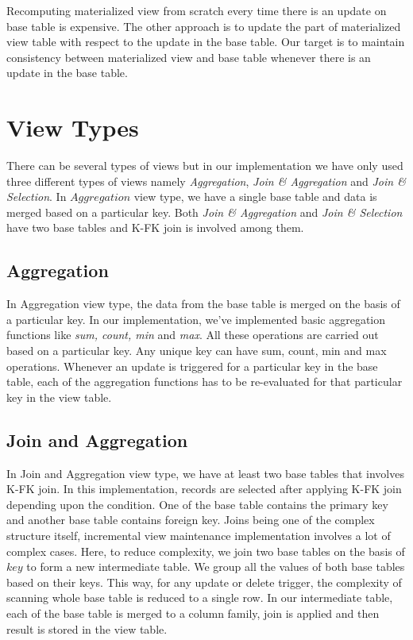 \documentclass[11pt,a4paper,bibtotoc,idxtotoc,headsepline,footsepline,footexclude,BCOR12mm,DIV13]{scrbook}
\begin{document}
Recomputing materialized view from scratch every time there is an update on base table is expensive. The other approach is to update the part of materialized view table with respect to the update in the base table. Our target is to maintain consistency between materialized view and base table whenever there is an update in the base table.

\section{View Types}
\label{View Types}
There can be several types of views but in our implementation we have only used three different types of views namely \emph{Aggregation}, \emph{Join \& Aggregation} and \emph{Join \& Selection}. In $Aggregation$ view type, we have a single base table and data is merged based on a particular key. Both  \emph{Join \& Aggregation} and \emph{Join \& Selection} have two base tables and K-FK join is involved among them. 

\subsection{Aggregation}
In Aggregation view type, the data from the base table is merged on the basis of a particular key. In our implementation, we've implemented basic aggregation functions like \emph{sum, count, min} and \emph{max}. All these operations are carried out based on a particular key. Any unique key can have sum, count, min and max operations. Whenever an update is triggered for a particular key in the base table, each of the aggregation functions has to be re-evaluated for that particular key in the view table.


\subsection{Join and Aggregation}
In Join and Aggregation view type, we have at least two base tables that involves K-FK join. In this implementation, records are selected after applying K-FK join depending upon the condition. One of the base table contains the primary key and another base table contains foreign key. Joins being one of the complex structure itself, incremental view maintenance implementation involves a lot of complex cases. Here, to reduce complexity, we join two base tables on the basis of $key$ to form a new intermediate table. We group all the values of both base tables based on their keys. This way, for any update or delete trigger, the complexity of scanning whole base table is reduced to a single row. In our intermediate table, each of the base table is merged to a column family, join is applied and then result is stored in the view table. 
\end{document}
